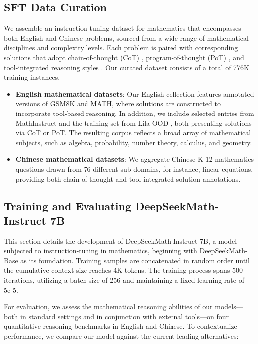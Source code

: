 \subsection{SFT Data Curation}

We assemble an instruction-tuning dataset for mathematics that encompasses both English and Chinese problems, sourced from a wide range of mathematical disciplines and complexity levels. Each problem is paired with corresponding solutions that adopt chain-of-thought (CoT) \citep{cot}, program-of-thought (PoT) \citep{pot,pal}, and tool-integrated reasoning styles \citep{tora}. Our curated dataset consists of a total of 776K training instances.

\begin{itemize}[topsep=0pt]
    \item \textbf{English mathematical datasets}: Our English collection features annotated versions of GSM8K and MATH, where solutions are constructed to incorporate tool-based reasoning. In addition, we include selected entries from MathInstruct \citep{MathInstruct} and the training set from Lila-OOD \citep{lila}, both presenting solutions via CoT or PoT. The resulting corpus reflects a broad array of mathematical subjects, such as algebra, probability, number theory, calculus, and geometry.
    \item \textbf{Chinese mathematical datasets}: We aggregate Chinese K-12 mathematics questions drawn from 76 different sub-domains, for instance, linear equations, providing both chain-of-thought and tool-integrated solution annotations.
\end{itemize}

\subsection{Training and Evaluating DeepSeekMath-Instruct 7B}

This section details the development of DeepSeekMath-Instruct 7B, a model subjected to instruction-tuning in mathematics, beginning with DeepSeekMath-Base as its foundation. Training samples are concatenated in random order until the cumulative context size reaches 4K tokens. The training process spans 500 iterations, utilizing a batch size of 256 and maintaining a fixed learning rate of 5e-5.

For evaluation, we assess the mathematical reasoning abilities of our models—both in standard settings and in conjunction with external tools—on four quantitative reasoning benchmarks in English and Chinese. To contextualize performance, we compare our model against the current leading alternatives:

